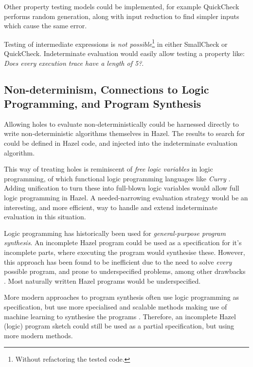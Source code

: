 Other property testing models could be implemented, for example QuickCheck \cite{QuickCheck} performs random generation, along with input reduction to find simpler inputs which cause the same error.

Testing of intermediate expressions is \textit{not possible}\footnote{Without refactoring the tested code.} in either SmallCheck or QuickCheck. Indeterminate evaluation would easily allow testing a property like: \textit{Does every execution trace have a length of 5?}.

\subsection{Non-determinism, Connections to Logic Programming, and Program Synthesis}
\label{sec:LogicProgramming}
Allowing holes to evaluate non-deterministically could be harnessed directly to write non-deterministic algorithms themselves in Hazel. The results to search for could be defined in Hazel code, and injected into the indeterminate evaluation algorithm.

This way of treating holes is reminiscent of \textit{free logic variables} in logic programming, of which functional logic programming languages \cite{FunctionalLogicProgramming} like \textit{Curry} \cite{CurryLang}. Adding unification \cite{UnificationSurvey} to turn these into full-blown logic variables would allow full logic programming in Hazel. A needed-narrowing evaluation strategy \cite{NeededNarrowing} would be an interesting, and more efficient, way to handle and extend indeterminate evaluation in this situation.

Logic programming has historically been used for \textit{general-purpose program synthesis}. An incomplete Hazel program could be used as a specification for it's incomplete parts, where executing the program would synthesise these. However, this approach has been found to be inefficient due to the need to solve \textit{every} possible program, and prone to underspecified problems, among other drawbacks \cite{LogicProgramSynthesisDrawbacks}. Most naturally written Hazel programs would be underspecified.

More modern approaches to program synthesis often use logic programming as specification, but use more specialised and scalable methods making use of machine learning to synthesise the programs \cite{NeuralGuidedLogicProgramSynthesis, ProgramSynthesisSketching}. Therefore, an incomplete Hazel (logic) program sketch could still be used as a partial specification, but using more modern methods.

